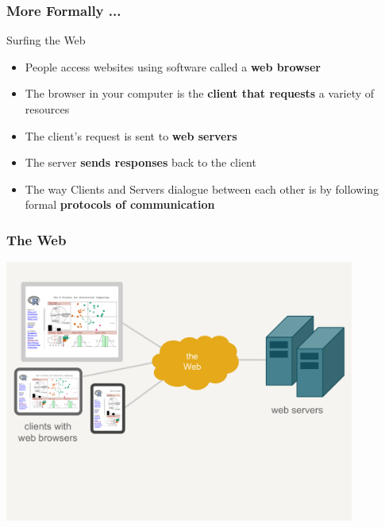 \documentclass{beamer}\usepackage[]{graphicx}\usepackage[]{color}
\begin{document}

\begin{frame}
\frametitle{More Formally ...}

\begin{block}{Surfing the Web}
\begin{itemize}
 \item People access websites using software called a \textbf{web browser} \\
 \item The browser in your computer is the \textbf{client that requests} a variety of resources 
 \item The client's request is sent to \textbf{web servers}
 \item The server \textbf{sends responses} back to the client
 \item The way Clients and Servers dialogue between each other is by following formal \textbf{protocols of communication}
\end{itemize}
\end{block}

\end{frame}


\begin{frame}
\frametitle{The Web}

\begin{center}
\includegraphics[width=11.5cm]{images/clients_servers.pdf}
\end{center}

\end{frame}
\end{document}
